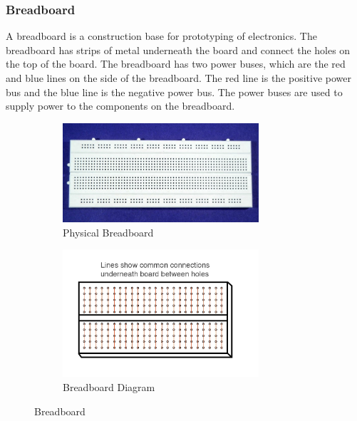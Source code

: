 \documentclass[a4paper, 10pt]{article}
\begin{document}
			\subsubsection{Breadboard}
				A breadboard is a construction base for prototyping of electronics. 
				The breadboard has strips of metal underneath the board and connect the holes on the top of the board. 
				The breadboard has two power buses, which are the red and blue lines on the side of the breadboard. 
				The red line is the positive power bus and the blue line is the negative power bus. 
				The power buses are used to supply power to the components on the breadboard.\\

				\begin{figure}[h!]
					\centering
					\begin{subfigure}{0.45\textwidth}
						\centering
						\includegraphics[width=0.8\textwidth]{./images/Breadboard.jpeg}
						\caption{Physical Breadboard}
					\end{subfigure}
					\hspace*{0.05\textwidth}
					\begin{subfigure}{0.45\textwidth}
						\centering
						\includegraphics[width=0.8\textwidth]{./images/breadboard_diagram.png}
						\caption{Breadboard Diagram}
					\end{subfigure}
					\caption{Breadboard}
					\label{fig:breadboard}
				\end{figure}
\end{document}
